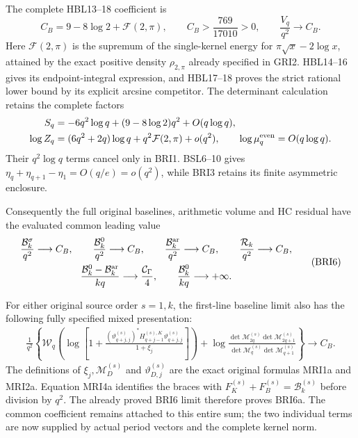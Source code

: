 \documentclass[11pt,a4paper]{article}
\begin{document}
The complete HBL13--18 coefficient is
\[
 C_B=9-8\log2+\mathcal F(2,\pi),\qquad
 C_B>\frac{769}{17010}>0,\qquad
 \frac{V_q}{q^2}\longrightarrow C_B.
 \tag{BRI5}
\]
Here $\mathcal F(2,\pi)$ is the supremum of the single-kernel
energy for $\pi\sqrt x-2\log x$, attained by the exact positive
density $\rho_{2,\pi}$ already specified in GRI2. HBL14--16
gives its endpoint-integral expression, and HBL17--18 proves
the strict rational lower bound by its explicit arcsine competitor.
The determinant calculation retains the complete factors
\[
\begin{split}
 S_q&=-6q^2\log q+(9-8\log2)q^2+O(q\log q),\\
 \log Z_q&=(6q^2+2q)\log q+q^2\mathcal F(2,\pi)+o(q^2),\qquad
 \log\mu_q^{\rm even}=O(q\log q).
\end{split}
\]
Their $q^2\log q$ terms cancel only in BRI1. BSL6--10 gives
$\eta_q+\eta_{q+1}-\eta_1=O(q/e)=o(q^2)$, while BRI3
retains its finite asymmetric enclosure.

Consequently the full original baselines, arithmetic volume and
HC residual have the evaluated common leading value
\[
\begin{gathered}
 \frac{\mathcal B_k^\sigma}{q^2}\longrightarrow C_B,\qquad
 \frac{\mathcal B_k^0}{q^2}\longrightarrow C_B,\qquad
 \frac{\mathcal B_k^{\rm ar}}{q^2}\longrightarrow C_B,\qquad
 \frac{\mathcal R_k}{q^2}\longrightarrow C_B,\\
 \frac{\mathcal B_k^0-\mathcal B_k^{\rm ar}}{kq}
                \longrightarrow\frac{\mathcal C_\Gamma}{4},
 \qquad \frac{\mathcal B_k^0}{kq}\longrightarrow+\infty.
\end{gathered}\tag{BRI6}
\]

For either original source order $s=1,k$, the first-line baseline
limit also has the following fully specified mixed presentation:
\[
\begin{split}
 \frac1{q^2}\left\{
 \mathcal W_q\left(\log\left[1+
   \frac{(\vartheta_{q+j,j}^{(s)})^*
        H_{q+j-1}^{(s),K}\vartheta_{q+j,j}^{(s)}}{1+\xi_j}
                                      \right]\right)
 +\log\frac{\det\mathcal M_{2q}^{(s)}\det\mathcal M_{2q+1}^{(s)}}
                 {\det\mathcal M_q^{(s)}\det\mathcal M_{q+1}^{(s)}}
                          \right\}\longrightarrow C_B.
\end{split}\tag{BRI6a}
\]
The definitions of $\xi_j,\mathcal M_D^{(s)}$ and
$\vartheta_{D,j}^{(s)}$ are the exact original formulas MRI1a
and MRI2a. Equation MRI4a identifies the braces with
$F_K^{(s)}+F_B^{(s)}=\mathcal B_k^{(s)}$ before division by
$q^2$. The already proved BRI6 limit therefore proves BRI6a.
The common coefficient remains attached to this entire sum;
the two individual terms are now supplied by actual period
vectors and the complete kernel norm.
\end{document}
